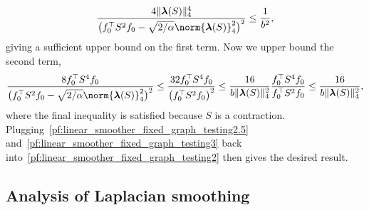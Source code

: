 \documentclass[twoside]{article}
\newcommand{\1}{\mathbf{1}}
\newcommand{\lambdavec}{\boldsymbol{\lambda}}
\theoremstyle{definition}
\theoremstyle{remark}
\begin{document}
\begin{equation}
\label{pf:linear_smoother_fixed_graph_testing2.5}
\frac{4 \|\lambdavec(S)\|_4^4}{\bigl(f_0^{\top}S^2f_0 - \sqrt{2/\alpha} \norm{\lambdavec(S)}_4^2\bigr)^2} \leq \frac{1}{b^2},
\end{equation}
giving a sufficient upper bound on the first term. Now we upper bound the second term,
\begin{equation}
\label{pf:linear_smoother_fixed_graph_testing3}
\frac{8f_0^{\top}S^4f_0 }{\bigl(f_0^{\top}S^2f_0 - \sqrt{2/\alpha} \norm{\lambdavec(S)}_4^2\bigr)^2} \leq \frac{32 f_0^{\top}S^4f_0 }{\bigl(f_0^{\top}S^2f_0\bigr)^2} \leq \frac{16}{b \|\lambdavec(S)\|_4^2} \frac{f_0^{\top}S^4f_0 }{f_0^{\top}S^2f_0} \leq \frac{16}{b \|\lambdavec(S)\|_4^2},
\end{equation}
where the final inequality is satisfied because $S$ is a contraction. Plugging~\eqref{pf:linear_smoother_fixed_graph_testing2.5} and~\eqref{pf:linear_smoother_fixed_graph_testing3} back into~\eqref{pf:linear_smoother_fixed_graph_testing2} then gives the desired result.\\
\subsection{Analysis of Laplacian smoothing}
\end{document}
